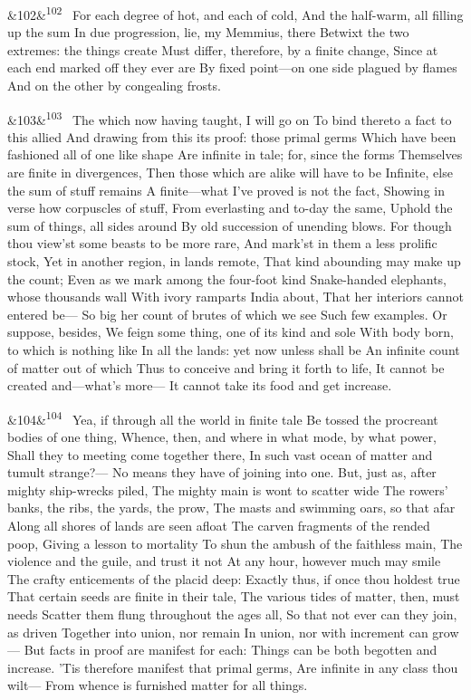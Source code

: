 \documentclass[12pt]{article}
\newcommand{\para}[1][]{\par\noindent\ifx&#1&\else\textsuperscript{\footnotesize #1}~\fi}
\begin{document}
\para[102] For each degree of hot, and each of cold, And the half-warm, all filling up the sum In due progression, lie, my Memmius, there Betwixt the two extremes: the things create Must differ, therefore, by a finite change, Since at each end marked off they ever are By fixed point---on one side plagued by flames And on the other by congealing frosts.

\para[103] The which now having taught, I will go on To bind thereto a fact to this allied And drawing from this its proof: those primal germs Which have been fashioned all of one like shape Are infinite in tale; for, since the forms Themselves are finite in divergences, Then those which are alike will have to be Infinite, else the sum of stuff remains A finite---what I've proved is not the fact, Showing in verse how corpuscles of stuff, From everlasting and to-day the same, Uphold the sum of things, all sides around By old succession of unending blows. For though thou view'st some beasts to be more rare, And mark'st in them a less prolific stock, Yet in another region, in lands remote, That kind abounding may make up the count; Even as we mark among the four-foot kind Snake-handed elephants, whose thousands wall With ivory ramparts India about, That her interiors cannot entered be--- So big her count of brutes of which we see Such few examples. Or suppose, besides, We feign some thing, one of its kind and sole With body born, to which is nothing like In all the lands: yet now unless shall be An infinite count of matter out of which Thus to conceive and bring it forth to life, It cannot be created and---what's more--- It cannot take its food and get increase.

\para[104] Yea, if through all the world in finite tale Be tossed the procreant bodies of one thing, Whence, then, and where in what mode, by what power, Shall they to meeting come together there, In such vast ocean of matter and tumult strange?--- No means they have of joining into one. But, just as, after mighty ship-wrecks piled, The mighty main is wont to scatter wide The rowers' banks, the ribs, the yards, the prow, The masts and swimming oars, so that afar Along all shores of lands are seen afloat The carven fragments of the rended poop, Giving a lesson to mortality To shun the ambush of the faithless main, The violence and the guile, and trust it not At any hour, however much may smile The crafty enticements of the placid deep: Exactly thus, if once thou holdest true That certain seeds are finite in their tale, The various tides of matter, then, must needs Scatter them flung throughout the ages all, So that not ever can they join, as driven Together into union, nor remain In union, nor with increment can grow--- But facts in proof are manifest for each: Things can be both begotten and increase. 'Tis therefore manifest that primal germs, Are infinite in any class thou wilt--- From whence is furnished matter for all things.
\end{document}
